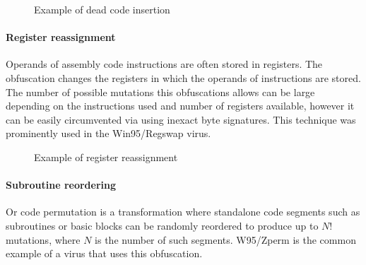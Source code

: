 \begin{figure}[H]
    \centering
    \caption{Example of dead code insertion}
    \label{fig_obf_dci}
\end{figure}

\paragraph*{Register reassignment}
Operands of assembly code instructions are often stored in registers. The obfuscation changes the registers in which the operands of instructions are stored. The number of possible mutations this obfuscations allows can be large depending on the instructions used and number of registers available, however it can be easily circumvented via using inexact byte signatures. This technique was prominently used in the Win95/Regswap virus.

\begin{figure}[H]
    \centering
    \caption{Example of register reassignment}
    \label{fig_obf_regswap}
\end{figure}

\paragraph*{Subroutine reordering}
Or code permutation is a transformation where standalone code segments such as subroutines or basic blocks can be randomly reordered to produce up to $N!$ mutations, where $N$ is the number of such segments. W95/Zperm is the common example of a virus that uses this obfuscation.

